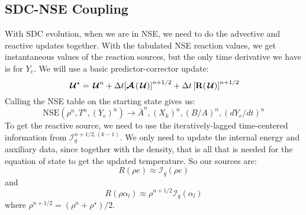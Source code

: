 \documentclass[times,modern]{aastex63}
\newcommand{\Ic}{{\boldsymbol{\mathcal{I}}}}
\newcommand{\Ics}{{\mathcal{I}}}
\newcommand{\Uc}{{\,\bm{\mathcal{U}}}}
\newcommand{\Rb}{{\bf R}}
\newcommand{\Adv}[1]{{\left [\boldsymbol{\mathcal{A}} \left(#1\right)\right]}}
\newcommand{\nse}[1]{{\mathrm{NSE}( #1 )}}
\begin{document}
\subsection{SDC-NSE Coupling}

With SDC evolution, when we are in NSE, we need to do the advective
and reactive updates together.  With the tabulated NSE reaction
values, we get instantaneous values of the reaction sources, but the only
time derivative we have is for $Y_e$.  We will
use a basic predictor-corrector update:
\begin{equation}
\Uc^\star = \Uc^n + \Delta t \Adv{\Uc}^{n+1/2} + \Delta t \left [\Rb (\Uc) \right ]^{n+1/2}
\end{equation}
Calling the NSE table on the starting state gives us:
\begin{equation}
\nse{\rho^n, T^n, (Y_e)^n} \rightarrow \bar{A}^n, (X_k)^n, (B/A)^n, (dY_e/dt)^n
\end{equation}
To get the reactive source, we need to use the iteratively-lagged time-centered information
from $\Ic_q^{n+1/2,(k-1)}$.  We only need to update the internal energy and auxiliary data,
since together with the density, that is all that is needed for the equation of state to get the
updated temperature.    So our sources are:
\begin{equation}
R(\rho e) \approx \Ics_q(\rho e)
\end{equation}
and
\begin{equation}
R(\rho \alpha_l) \approx \rho^{n+1/2} \Ics_q(\alpha_l)
\end{equation}
where $\rho^{n+1/2} = (\rho^n + \rho^\star)/2$.
\end{document}
